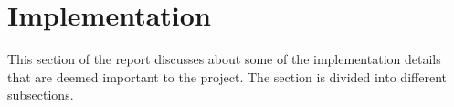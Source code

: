 \documentclass[11pt]{article}
\begin{document}
{\begin{itemize}
\begin{center}
		


\end{center}
 
	
\section{Implementation} 

This section of the report discusses about some of the implementation details that are deemed important to the project. The section is divided into different subsections.

\end{itemize}}
\end{document}
